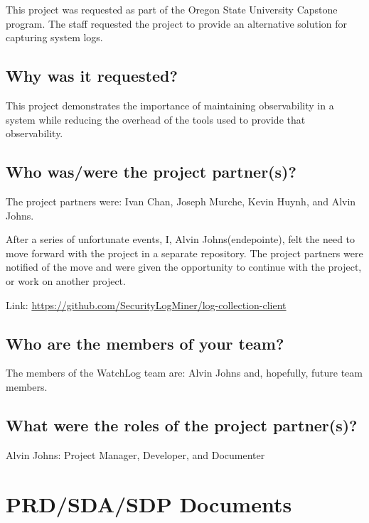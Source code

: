 \documentclass{article}
\begin{document}
This project was requested as part of the Oregon State University Capstone program. The staff requested the project to provide an alternative solution for capturing system logs.

\subsection{Why was it requested?}

This project demonstrates the importance of maintaining observability in a system while reducing the overhead of the tools used to provide that observability.

\subsection{Who was/were the project partner(s)?}

The project partners were: Ivan Chan, Joseph Murche, Kevin Huynh, and Alvin Johns.\vspace{0.25cm}

After a series of unfortunate events, I, Alvin Johns(endepointe), felt the need to move forward with the project in a separate repository. The project partners were notified of the move and were given the opportunity to continue with the project, or work on another project.\vspace{0.25cm}

Link: \url{https://github.com/SecurityLogMiner/log-collection-client}

\subsection{Who are the members of your team?}

The members of the WatchLog team are: Alvin Johns and, hopefully, future team members.

\subsection{What were the roles of the project partner(s)?}

Alvin Johns: Project Manager, Developer, and Documenter

\newpage

\section{PRD/SDA/SDP Documents}
\end{document}
